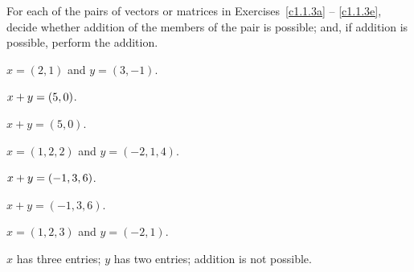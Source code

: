 \documentclass{ximera}
\begin{document}
\noindent For each of the pairs of vectors or matrices in
Exercises~\ref{c1.1.3a} -- \ref{c1.1.3e}, decide whether addition
of the members of the pair is possible; and, if addition is possible,
perform the addition.
\begin{exercise}\label{c1.1.3a}
  $x=(2,1)$ and $y=(3,-1)$.
  
  \begin{multipleChoice}
  \end{multipleChoice}

 
  \begin{exercise}
    $x + y = \left({5},{0}\right)$.

\begin{solution}
$x + y = (5,0)$.

\end{solution}
  \end{exercise}

\begin{solution}


\end{solution}
\end{exercise}

\begin{exercise}\label{c1.1.3b}
  $x=(1,2,2)$ and $y=(-2,1,4)$.
  
  \begin{multipleChoice}
  \end{multipleChoice}
  \begin{exercise}
    $x + y = \left({-1},{3},{6}\right)$.

\begin{solution}
$x + y = (-1,3,6)$.

\end{solution}
  \end{exercise}

\begin{solution}


\end{solution}
\end{exercise}

\begin{exercise}\label{c1.1.3c}
  $x=(1,2,3)$ and $y=(-2,1)$.
  
  \begin{multipleChoice}
  \end{multipleChoice}  

\begin{solution}
$x$ has three entries; $y$ has two entries; addition is not possible.

\end{solution}
\end{exercise}
\end{document}
